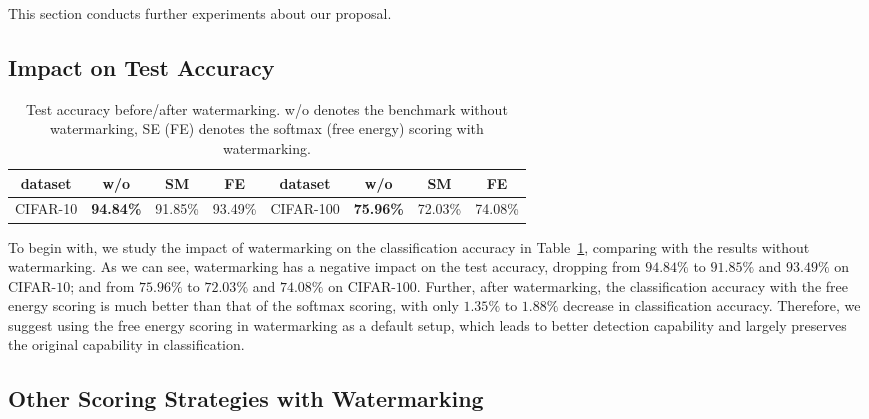 \documentclass{article}
\begin{document}
This section conducts further experiments about our proposal. 



\subsection{Impact on Test Accuracy}


\begin{table}[t]
\centering
\caption{{Test accuracy before/after watermarking. w/o denotes the benchmark without watermarking, SE (FE) denotes the softmax (free energy) scoring with watermarking.}} \label{tab: accu}
\vspace{5pt}
\small
\begin{tabular}{c|ccc||c|ccc}
\toprule[1.5pt]
 dataset & {w/o} & {SM} & {FE} & dataset & {w/o} & {SM} & {FE} \\
\midrule[0.6pt]
CIFAR-10             & \textbf{94.84\%}                   & 91.85\%                  & 93.49\%                  & CIFAR-100             & \textbf{75.96\%}                   & 72.03\%                  & 74.08\%                  \\  
\bottomrule[1.5pt]    
\end{tabular}
\end{table}

{To begin with, we study the impact of watermarking on the classification accuracy in Table~\ref{tab: accu}, comparing with the results without watermarking.  As we can see, watermarking has a negative impact on the test accuracy, dropping from $94.84\%$ to $91.85\%$ and $93.49\%$ on CIFAR-$10$; and from $75.96\%$ to $72.03\%$ and $74.08\%$ on CIFAR-$100$. Further, after watermarking, the classification accuracy with the free energy scoring is much better than that of the softmax scoring, with only $1.35\%$ to $1.88\%$ decrease in classification accuracy. Therefore, we suggest using the free energy scoring in watermarking as a default setup, which leads to better detection capability and largely preserves the original capability in classification.}





\subsection{Other Scoring Strategies with Watermarking}
\end{document}
